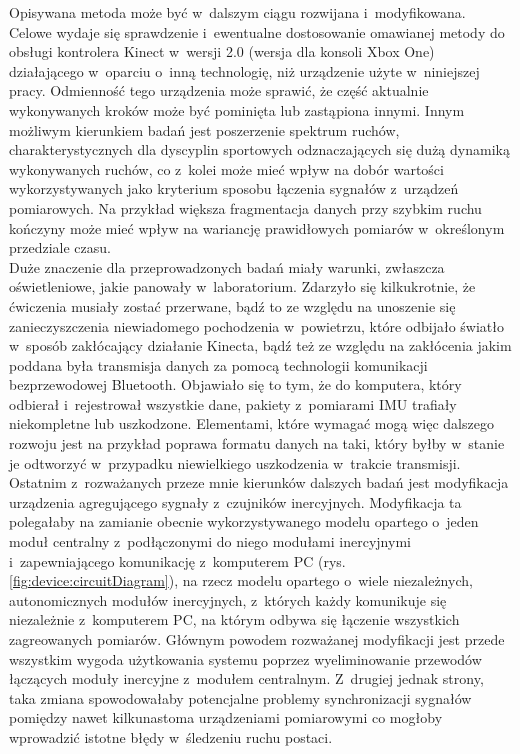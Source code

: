 Opisywana metoda może być w~dalszym ciągu rozwijana i~modyfikowana. Celowe wydaje się sprawdzenie i~ewentualne dostosowanie omawianej metody do obsługi kontrolera Kinect w~wersji 2.0 (wersja dla konsoli Xbox One) działającego w~oparciu o~inną technologię, niż urządzenie użyte w~niniejszej pracy. Odmienność tego urządzenia może sprawić, że część aktualnie wykonywanych kroków może być pominięta lub zastąpiona innymi. Innym możliwym kierunkiem badań jest poszerzenie spektrum ruchów, charakterystycznych dla dyscyplin sportowych odznaczających się dużą dynamiką wykonywanych ruchów, co z~kolei może mieć wpływ na dobór wartości wykorzystywanych jako kryterium sposobu łączenia sygnałów z~urządzeń pomiarowych. Na przykład większa fragmentacja danych przy szybkim ruchu kończyny może mieć wpływ na wariancję prawidłowych pomiarów w~określonym przedziale czasu.\\
Duże znaczenie dla przeprowadzonych badań miały warunki, zwłaszcza oświetleniowe, jakie panowały w~laboratorium. Zdarzyło się kilkukrotnie, że ćwiczenia musiały zostać przerwane, bądź to ze względu na unoszenie się zanieczyszczenia niewiadomego pochodzenia w~powietrzu, które odbijało światło w~sposób zakłócający działanie Kinecta, bądź też ze względu na zakłócenia jakim poddana była transmisja danych za pomocą technologii  komunikacji bezprzewodowej Bluetooth. Objawiało się to tym, że do komputera, który odbierał i~rejestrował wszystkie dane, pakiety z~pomiarami IMU trafiały niekompletne lub uszkodzone. Elementami, które wymagać mogą więc dalszego rozwoju jest na przykład poprawa formatu danych na taki, który byłby w~stanie je odtworzyć w~przypadku niewielkiego uszkodzenia w~trakcie transmisji.\\
Ostatnim z~rozważanych przeze mnie kierunków dalszych badań jest modyfikacja urządzenia agregującego sygnały z~czujników inercyjnych. Modyfikacja ta polegałaby na zamianie obecnie wykorzystywanego modelu opartego o~jeden moduł centralny z~podłączonymi do niego modułami inercyjnymi i~zapewniającego komunikację z~komputerem PC (rys. \ref{fig:device:circuitDiagram}), na rzecz modelu opartego o~wiele niezależnych, autonomicznych modułów inercyjnych, z~których każdy komunikuje się niezależnie z~komputerem PC, na którym odbywa się łączenie wszystkich zagreowanych pomiarów. Głównym powodem rozważanej modyfikacji jest przede wszystkim wygoda użytkowania systemu poprzez wyeliminowanie przewodów łączących moduły inercyjne z~modułem centralnym. Z~drugiej jednak strony, taka zmiana spowodowałaby potencjalne problemy synchronizacji sygnałów pomiędzy nawet kilkunastoma urządzeniami pomiarowymi co mogłoby wprowadzić istotne błędy w~śledzeniu ruchu postaci.
